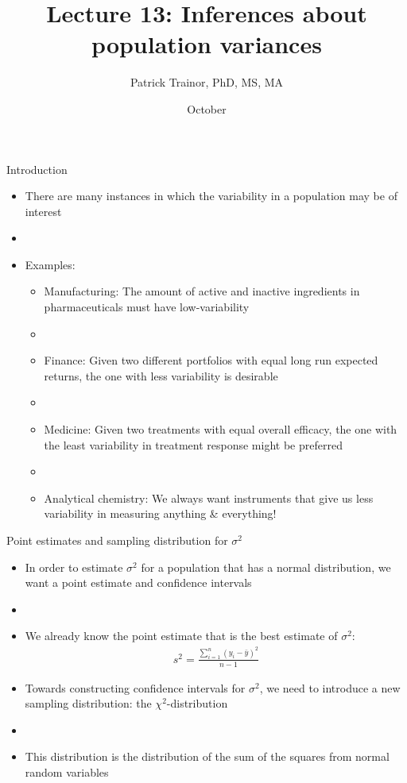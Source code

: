 \documentclass[xcolor=dvipsnames]{beamer}
\title[Lecture 13]{Lecture 13: Inferences about population variances}
\author[Patrick Trainor]{Patrick Trainor, PhD, MS, MA}
\institute[NMSU]{New Mexico State University}
\date{October}
\begin{document}
	
\begin{frame}
	\maketitle
\end{frame}

\begin{frame}{Introduction}
	\begin{itemize}
		\item There are many instances in which the variability in a population may be of interest
		\item[]
		\item Examples:
		\begin{itemize}
			\item Manufacturing: The amount of active and inactive ingredients in pharmaceuticals must have low-variability
			\item[]
			\item Finance: Given two different portfolios with equal long run expected returns, the one with less variability is desirable
			\item[]
			\item Medicine: Given two treatments with equal overall efficacy, the one with the least variability in treatment response might be preferred
			\item[]
			\item Analytical chemistry: We always want instruments that give us less variability in measuring anything \& everything!
		\end{itemize}
	\end{itemize}
\end{frame}

\begin{frame}{Point estimates and sampling distribution for $\sigma^2$}
	\begin{itemize}
		\item In order to estimate $\sigma^2$ for a population that has a normal distribution, we want a point estimate and confidence intervals
		\item[]
		\item We already know the point estimate that is the best estimate of $\sigma^2$:
		\begin{gather*}
			s^2=\frac{\sum_{i=1}^{n}(y_i-\bar{y})^2}{n-1}
		\end{gather*}
		\item Towards constructing confidence intervals for $\sigma^2$, we need to introduce a new sampling distribution: the $\chi^2$-distribution 
		\item[]
		\item This distribution is the distribution of the sum of the squares from normal random variables
	\end{itemize}
\end{frame}
\end{document}
